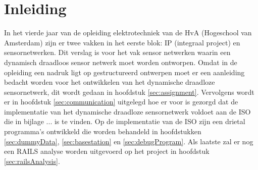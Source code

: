\section{Inleiding}

In het vierde jaar van de opleiding elektrotechniek van de HvA (Hogeschool van Amsterdam) zijn er twee vakken in het eerste blok: IP (integraal project) en sensornetwerken. Dit verslag is voor het vak sensor netwerken waarin een dynamisch draadloos sensor netwerk moet worden ontworpen. Omdat in de opleiding een nadruk ligt op gestructureerd ontwerpen moet er een aanleiding bedacht worden voor het ontwikkelen van het dynamische draadloze sensornetwerk, dit wordt gedaan in hoofdstuk \ref{sec:assignment}. Vervolgens wordt er in hoofdstuk \ref{sec:communication} uitgelegd hoe er voor is gezorgd dat de implementatie van het dynamische draadloze sensornetwerk voldoet aan de ISO die in bijlage ...  is te vinden. Op de implementatie van de ISO zijn een drietal programma's ontwikkeld die worden behandeld in hoofdstukken \ref{sec:dummyData}, \ref{sec:basestation} en \ref{sec:debugProgram}. Als laatste zal er nog een RAILS analyse worden uitgevoerd op het project in hoofdstuk \ref{sec:railsAnalysis}.